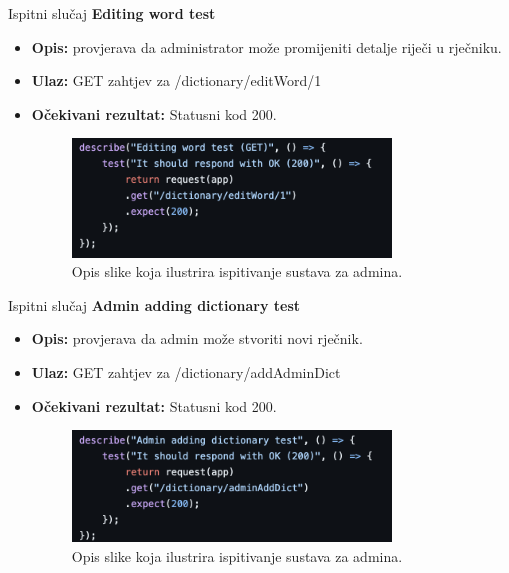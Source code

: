 			Ispitni slučaj \textbf{Editing word test}
			\begin{itemize}
				\item \textbf{Opis:} provjerava da administrator može promijeniti detalje riječi u rječniku.
				\item \textbf{Ulaz:} GET zahtjev za /dictionary/editWord/1
				\item \textbf{Očekivani rezultat:} Statusni kod 200.
				\begin{figure}[h]
					\centering
					\includegraphics[width=0.8\textwidth]{slike/testovi/admin_edit_word_test.png}
					\caption{Opis slike koja ilustrira ispitivanje sustava za admina.}
					\label{fig:testovi_admin_slika}
				\end{figure}
			\end{itemize}

			Ispitni slučaj \textbf{Admin adding dictionary test}
			\begin{itemize}
				\item \textbf{Opis:} provjerava da admin može stvoriti novi rječnik.
				\item \textbf{Ulaz:} GET zahtjev za /dictionary/addAdminDict
				\item \textbf{Očekivani rezultat:} Statusni kod 200.
				\begin{figure}[h]
					\centering
					\includegraphics[width=0.8\textwidth]{slike/testovi/admin_add_dictionary_test.png}
					\caption{Opis slike koja ilustrira ispitivanje sustava za admina.}
					\label{fig:testovi_admin_slika}
				\end{figure}
			\end{itemize}
			\newpage
			
